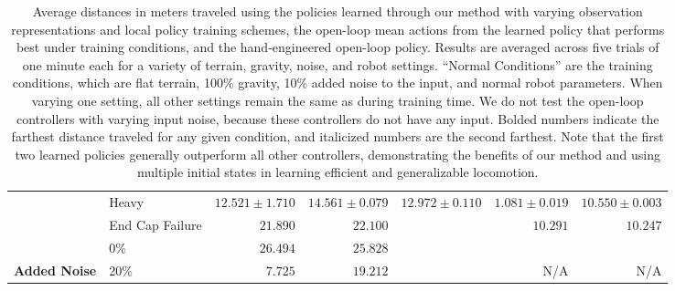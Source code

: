\begin{table}[t]
{\begin{tabular}{|llrrrrr|}
            \rowcolor[HTML]{D3D3D3}
            \cellcolor[HTML]{D3D3D3}                                   & Heavy           & \multicolumn{1}{r|}{\cellcolor[HTML]{D3D3D3}$12.521\pm1.710$}          & \multicolumn{1}{r|}{\cellcolor[HTML]{D3D3D3}$\mathbf{14.561\pm0.079}$} & \multicolumn{1}{r|}{\cellcolor[HTML]{D3D3D3}$\mathit{12.972\pm0.110}$} & \multicolumn{1}{r|}{\cellcolor[HTML]{D3D3D3}$1.081\pm0.019$}     & $10.550\pm0.003$ \\
            \rowcolor[HTML]{D3D3D3}
            \multirow{-2}{*}{\cellcolor[HTML]{D3D3D3}\textbf{Robot}}   & End Cap Failure & \multicolumn{1}{r|}{\cellcolor[HTML]{D3D3D3}$\mathit{21.890}$}         & \multicolumn{1}{r|}{\cellcolor[HTML]{D3D3D3}$\mathbf{22.100}$}         & \multicolumn{1}{r|}{\cellcolor[HTML]{D3D3D3}$ $}                       & \multicolumn{1}{r|}{\cellcolor[HTML]{D3D3D3}$10.291$}            & $10.247$ \\
                                                                       & 0\%             & \multicolumn{1}{r|}{$\mathbf{26.494}$}                                 & \multicolumn{1}{r|}{$\mathit{25.828}$}                                 & \multicolumn{1}{r|}{$ $}                                               & \multicolumn{1}{r|}{}                                            & \\
            \multirow{-2}{*}{\textbf{Added Noise}}                     & 20\%            & \multicolumn{1}{r|}{$\mathit{7.725}$}                                  & \multicolumn{1}{r|}{$\mathbf{19.212}$}                                 & \multicolumn{1}{r|}{$ $}                                               & \multicolumn{1}{r|}{\multirow{-2}{*}{N/A}}                       & \multirow{-2}{*}{N/A} \\
            \hline
        \end{tabular}%
    }
    \caption{
        \label{table:distance}
        Average distances in meters traveled using the policies learned through
        our method with varying observation representations and local policy
        training schemes, the open-loop mean actions from the learned policy
        that performs best under training conditions, and the hand-engineered
        open-loop policy. Results are averaged across five trials of one minute
        each for a variety of terrain, gravity, noise, and robot settings.
        ``Normal Conditions'' are the training conditions, which are flat
        terrain, 100\% gravity, 10\% added noise to the input, and normal robot
        parameters. When varying one setting, all other settings remain the same
        as during training time. We do not test the open-loop controllers with
        varying input noise, because these controllers do not have any input.
        Bolded numbers indicate the farthest distance traveled for any given
        condition, and italicized numbers are the second farthest. Note that the
        first two learned policies generally outperform all other controllers,
        demonstrating the benefits of our method and using multiple initial
        states in learning efficient and generalizable locomotion.
    }
\end{table}

